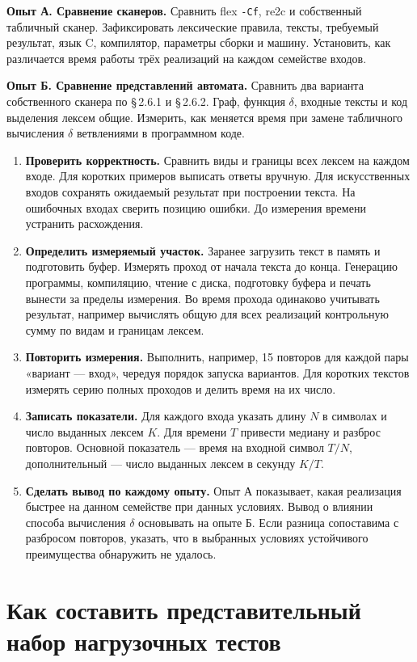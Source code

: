 \documentclass[12pt,a4paper]{article}
\newcommand{\parag}[1]{\S\,#1}
\newcommand{\code}[1]{\texttt{#1}}
\newcommand{\task}[1]{\par\medskip\noindent\textbf{#1}\quad}
\begin{document}
\task{Опыт А. Сравнение сканеров.} Сравнить flex \code{-Cf}, re2c и собственный табличный сканер. Зафиксировать лексические правила, тексты, требуемый результат, язык C, компилятор, параметры сборки и машину. Установить, как различается время работы трёх реализаций на каждом семействе входов.

\task{Опыт Б. Сравнение представлений автомата.} Сравнить два варианта собственного сканера по \parag{2.6.1} и \parag{2.6.2}. Граф, функция $\delta$, входные тексты и код выделения лексем общие. Измерить, как меняется время при замене табличного вычисления $\delta$ ветвлениями в программном коде.

\begin{enumerate}
\item \textbf{Проверить корректность.} Сравнить виды и границы всех лексем на каждом входе. Для коротких примеров выписать ответы вручную. Для искусственных входов сохранять ожидаемый результат при построении текста. На ошибочных входах сверить позицию ошибки. До измерения времени устранить расхождения.
\item \textbf{Определить измеряемый участок.} Заранее загрузить текст в память и подготовить буфер. Измерять проход от начала текста до конца. Генерацию программы, компиляцию, чтение с диска, подготовку буфера и печать вынести за пределы измерения. Во время прохода одинаково учитывать результат, например вычислять общую для всех реализаций контрольную сумму по видам и границам лексем.
\item \textbf{Повторить измерения.} Выполнить, например, 15 повторов для каждой пары «вариант --- вход», чередуя порядок запуска вариантов. Для коротких текстов измерять серию полных проходов и делить время на их число.
\item \textbf{Записать показатели.} Для каждого входа указать длину $N$ в символах и число выданных лексем $K$. Для времени $T$ привести медиану и разброс повторов. Основной показатель --- время на входной символ $T/N$, дополнительный --- число выданных лексем в секунду $K/T$.
\item \textbf{Сделать вывод по каждому опыту.} Опыт А показывает, какая реализация быстрее на данном семействе при данных условиях. Вывод о влиянии способа вычисления $\delta$ основывать на опыте Б. Если разница сопоставима с разбросом повторов, указать, что в выбранных условиях устойчивого преимущества обнаружить не удалось.
\end{enumerate}

\section{Как составить представительный набор нагрузочных тестов}
\end{document}
